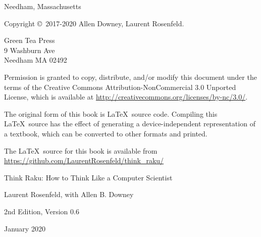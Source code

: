 \documentclass[10pt]{book}
\newcommand{\thetitle}{Think Raku: How to Think Like a Computer Scientist}
\newcommand{\theversion}{2nd Edition, Version 0.6}
\newcommand{\thedate}{January 2020}
\begin{document}
\begin{latexonly}
\begin{flushright}
{\small Needham, Massachusetts}

\vfill

\end{flushright}


\pagebreak
\thispagestyle{empty}

{\small
Copyright \copyright ~2017-2020 Allen Downey, Laurent Rosenfeld.


\vspace{0.2in}

\begin{flushleft}
Green Tea Press       \\
9 Washburn Ave        \\
Needham MA 02492
\end{flushleft}

Permission is granted to copy, distribute, and/or modify this document
under the terms of the Creative Commons Attribution-NonCommercial 3.0 Unported
License, which is available at \url{http://creativecommons.org/licenses/by-nc/3.0/}.

The original form of this book is \LaTeX\ source code.  Compiling this
\LaTeX\ source has the effect of generating a device-independent
representation of a textbook, which can be converted to other formats
and printed.

The \LaTeX\ source for this book is available from
\url{https://github.com/LaurentRosenfeld/think_raku/}

\vspace{0.2in}

} %

\end{latexonly}



\begin{htmlonly}


{\Large \thetitle}

{\large Laurent Rosenfeld,
with Allen B. Downey}

\theversion

\thedate

\setcounter{chapter}{-1}

\end{htmlonly}

\fi

% 

\end{document}
